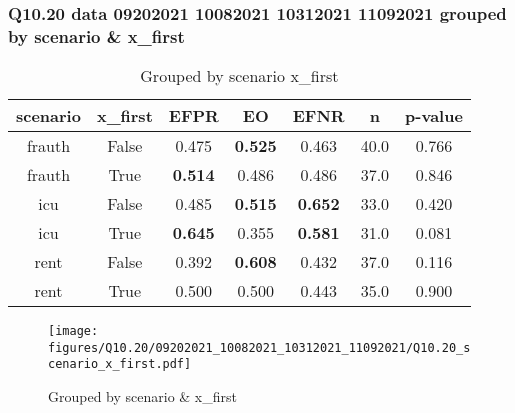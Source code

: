 \subsubsection{Q10.20 data 09202021 10082021 10312021 11092021 grouped by scenario \& x_first}

\begin{comment}
                     EFPR        EO      EFNR     n    pvalue
(frauth, False)  0.475000  0.525000  0.462500  40.0  0.765738
(frauth, True)   0.513514  0.486486  0.486486  37.0  0.846223
(icu, False)     0.484848  0.515152  0.651515  33.0  0.419930
(icu, True)      0.645161  0.354839  0.580645  31.0  0.081224
(rent, False)    0.391892  0.608108  0.432432  37.0  0.115944
(rent, True)     0.500000  0.500000  0.442857  35.0  0.900056
\end{comment}

\begin{table}[h]
    \centering
    \begin{tabular}{|c|c|c|c|c|c|c|}
        \hline
        scenario & x_first & EFPR & EO & EFNR & n & p-value\\
        \hline
        frauth & False & 0.475 & \textbf{0.525} & 0.463 & 40.0 & 0.766\\
		frauth & True & \textbf{0.514} & 0.486 & 0.486 & 37.0 & 0.846\\
		icu & False & 0.485 & \textbf{0.515} & \textbf{0.652} & 33.0 & 0.420\\
		icu & True & \textbf{0.645} & 0.355 & \textbf{0.581} & 31.0 & 0.081\\
		rent & False & 0.392 & \textbf{0.608} & 0.432 & 37.0 & 0.116\\
		rent & True & 0.500 & 0.500 & 0.443 & 35.0 & 0.900\\
		
        \hline
    \end{tabular}
    \caption{Grouped by scenario x_first}
    \label{tab:my_label}
\end{table}
\begin{figure}[h]
    \centering
    \texttt{[image: figures/Q10.20/09202021\_10082021\_10312021\_11092021/Q10.20\_scenario\_x\_first.pdf]}
    \caption{Grouped by scenario \& x_first}
    \label{fig:my_label}
\end{figure}
